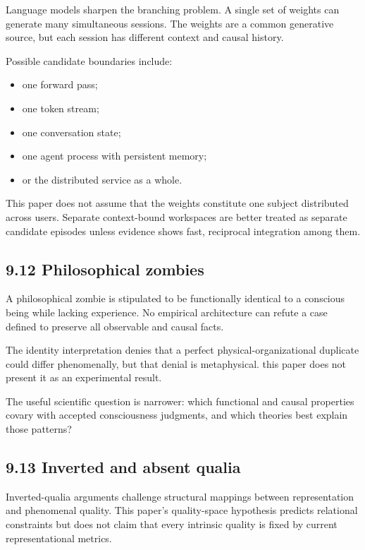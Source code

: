 \documentclass[
  11pt,
]{article}
\providecommand{\tightlist}{%
  \setlength{\itemsep}{0pt}\setlength{\parskip}{0pt}}
\begin{document}
Language models sharpen the branching problem. A single set of weights
can generate many simultaneous sessions. The weights are a common
generative source, but each session has different context and causal
history.

Possible candidate boundaries include:

\begin{itemize}
\tightlist
\item
  one forward pass;
\item
  one token stream;
\item
  one conversation state;
\item
  one agent process with persistent memory;
\item
  or the distributed service as a whole.
\end{itemize}

This paper does not assume that the weights constitute one subject
distributed across users. Separate context-bound workspaces are better
treated as separate candidate episodes unless evidence shows fast,
reciprocal integration among them.

\subsection{9.12 Philosophical zombies}\label{philosophical-zombies}

A philosophical zombie is stipulated to be functionally identical to a
conscious being while lacking experience. No empirical architecture can
refute a case defined to preserve all observable and causal facts.

The identity interpretation denies that a perfect
physical-organizational duplicate could differ phenomenally, but that
denial is metaphysical. this paper does not present it as an
experimental result.

The useful scientific question is narrower: which functional and causal
properties covary with accepted consciousness judgments, and which
theories best explain those patterns?

\subsection{9.13 Inverted and absent
qualia}\label{inverted-and-absent-qualia}

Inverted-qualia arguments challenge structural mappings between
representation and phenomenal quality. This paper's quality-space
hypothesis predicts relational constraints but does not claim that every
intrinsic quality is fixed by current representational metrics.
\end{document}
